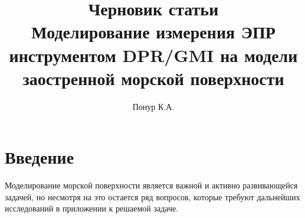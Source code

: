 

%

\newcommand\fullsum{\sum\limits_{n=1}^{N} \sum\limits_{m=1}^{M}}
\newcommand\fullphase{\omega_{nm}t + \vec \kappa_{nm}\vec r_0 + \psi_{nm}}
%
%
%

\title{Черновик статьи \\ \textbf{Моделирование измерения
ЭПР инструментом DPR/GMI на модели заостренной морской
поверхности}}
\author{Понур К.А.}

%

\maketitle
\section*{Введение}
Моделирование морской поверхности является важной и активно развивающейся
задачей, но несмотря на это остается ряд вопросов, которые требуют дальнейших исследований в приложении к решаемой
задаче. 

